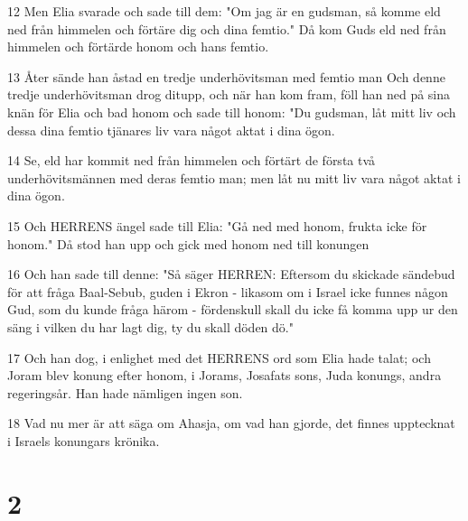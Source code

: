 \par 12 Men Elia svarade och sade till dem: "Om jag är en gudsman, så komme eld ned från himmelen och förtäre dig och dina femtio." Då kom Guds eld ned från himmelen och förtärde honom och hans femtio.
\par 13 Åter sände han åstad en tredje underhövitsman med femtio man Och denne tredje underhövitsman drog ditupp, och när han kom fram, föll han ned på sina knän för Elia och bad honom och sade till honom: "Du gudsman, låt mitt liv och dessa dina femtio tjänares liv vara något aktat i dina ögon.
\par 14 Se, eld har kommit ned från himmelen och förtärt de första två underhövitsmännen med deras femtio man; men låt nu mitt liv vara något aktat i dina ögon.
\par 15 Och HERRENS ängel sade till Elia: "Gå ned med honom, frukta icke för honom." Då stod han upp och gick med honom ned till konungen
\par 16 Och han sade till denne: "Så säger HERREN: Eftersom du skickade sändebud för att fråga Baal-Sebub, guden i Ekron - likasom om i Israel icke funnes någon Gud, som du kunde fråga härom - fördenskull skall du icke få komma upp ur den säng i vilken du har lagt dig, ty du skall döden dö."
\par 17 Och han dog, i enlighet med det HERRENS ord som Elia hade talat; och Joram blev konung efter honom, i Jorams, Josafats sons, Juda konungs, andra regeringsår. Han hade nämligen ingen son.
\par 18 Vad nu mer är att säga om Ahasja, om vad han gjorde, det finnes upptecknat i Israels konungars krönika.

\chapter{2}

